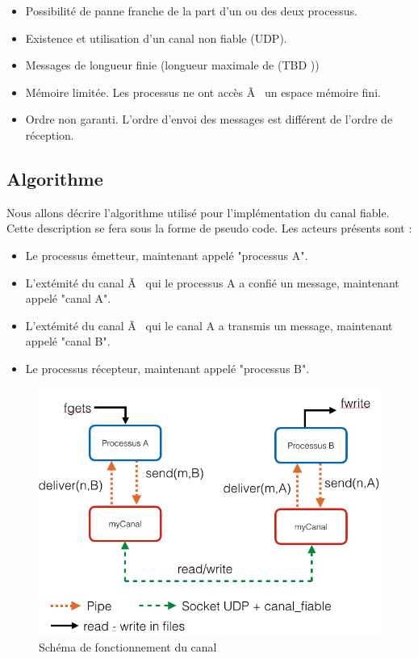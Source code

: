 \documentclass[a4paper, 10pt, french]{article}
\begin{document}
\begin{itemize}
	\item Possibilité de panne franche de la part d'un ou des deux processus.
	\item Existence et utilisation d'un canal non fiable (UDP).
	\item Messages de longueur finie (longueur maximale de  (TBD ))
	\item Mémoire limitée. Les processus ne ont accès Ã  un espace mémoire fini.
	\item Ordre non garanti. L'ordre d'envoi des messages est différent de l'ordre de réception.
\end{itemize}


\subsection{Algorithme}
Nous allons décrire l'algorithme utilisé pour l'implémentation du canal fiable. Cette description se fera sous la forme de pseudo code. Les acteurs présents sont :
\begin{itemize}
	\item Le processus émetteur, maintenant appelé "processus A".
	\item L'extémité du canal Ã  qui le processus A a confié un message, maintenant appelé "canal A".
	\item L'extémité du canal Ã  qui le canal A a transmis un message, maintenant appelé "canal B".
	\item Le processus récepteur, maintenant appelé "processus B". \newline
\end{itemize}

\begin{figure}[!h]
\begin{center}
   	\includegraphics[scale=0.4]{exchange_stack.png}
	\caption{Schéma de fonctionnement du canal}
	\label{fig:canal}
\end{center}
\end{figure}
\end{document}
